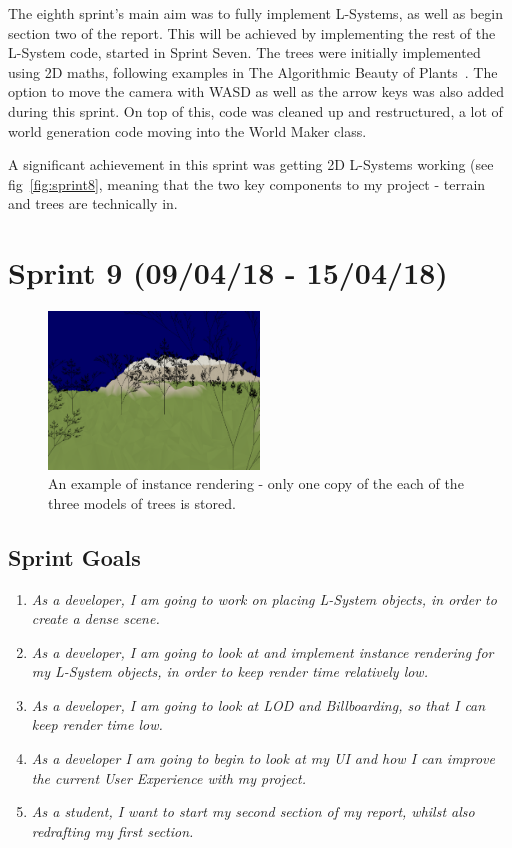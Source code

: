 \documentclass[a4paper,10pt]{report}
\begin{document}
The eighth sprint's main aim was to fully implement L-Systems, as well as begin section two of the report. This will be achieved by implementing the rest of the L-System code, started in Sprint Seven. The trees were initially implemented using 2D maths, following examples in The Algorithmic Beauty of Plants~\cite{prusinkiewicz2012algorithmic}. The option to move the camera with WASD as well as the arrow keys was also added during this sprint. On top of this, code was cleaned up and restructured, a lot of world generation code moving into the World Maker class.

A significant achievement in this sprint was getting 2D L-Systems working (see fig~\ref{fig:sprint8}, meaning that the two key components to my project - terrain and trees are technically in. 


\clearpage
\section{Sprint 9 (09/04/18 -  15/04/18)}

\begin{figure}[h!]
    \centering
  \includegraphics[width=0.5\textwidth]{Sprint9-1.png}
 \caption{An example of instance rendering - only one copy of the each of the three models of trees is stored.}
 \label{fig:sprint9-1}
\end{figure}

\subsection{Sprint Goals}
\begin{enumerate}
    \item \textit{ As a developer, I am going to work on placing L-System objects, in order to create a dense scene.}

    \item \textit{ As a developer, I am going to look at and implement instance rendering for my L-System objects, in order to keep render time relatively low.}

    \item \textit{ As a developer, I am going to look at LOD and Billboarding, so that I can keep render time low.}

    \item \textit{ As a developer I am going to begin to look at my UI and how I can improve the current User Experience with my project.}

    \item \textit{ As a student, I want to start my second section of my report, whilst also redrafting my first section. }
\end{enumerate}
\end{document}
